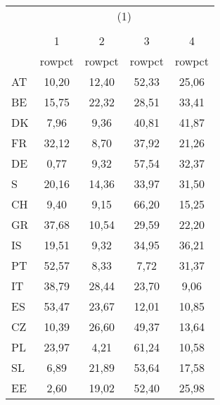 {
\def\sym#1{\ifmmode^{#1}\else\(^{#1}\)\fi}
\begin{tabular}{l*{4}{c}}
\hline\hline
            &\multicolumn{4}{c}{(1)}                            \\
            &\multicolumn{4}{c}{}                               \\
            &           1&           2&           3&           4\\
            &      rowpct&      rowpct&      rowpct&      rowpct\\
\hline
AT          &       10,20&       12,40&       52,33&       25,06\\
BE          &       15,75&       22,32&       28,51&       33,41\\
DK          &        7,96&        9,36&       40,81&       41,87\\
FR          &       32,12&        8,70&       37,92&       21,26\\
DE          &        0,77&        9,32&       57,54&       32,37\\
S           &       20,16&       14,36&       33,97&       31,50\\
CH          &        9,40&        9,15&       66,20&       15,25\\
GR          &       37,68&       10,54&       29,59&       22,20\\
IS          &       19,51&        9,32&       34,95&       36,21\\
PT          &       52,57&        8,33&        7,72&       31,37\\
IT          &       38,79&       28,44&       23,70&        9,06\\
ES          &       53,47&       23,67&       12,01&       10,85\\
CZ          &       10,39&       26,60&       49,37&       13,64\\
PL          &       23,97&        4,21&       61,24&       10,58\\
SL          &        6,89&       21,89&       53,64&       17,58\\
EE          &        2,60&       19,02&       52,40&       25,98\\
\hline\hline
\end{tabular}
}
